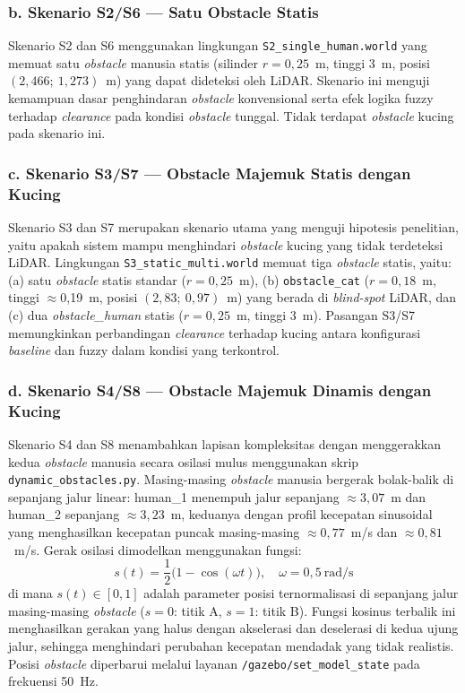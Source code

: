 \subsubsection*{b. Skenario S2/S6 --- Satu Obstacle Statis}

Skenario S2 dan S6 menggunakan lingkungan \texttt{S2\_single\_human.world} yang memuat satu \textit{obstacle} manusia statis (silinder $r = 0{,}25$~m, tinggi 3~m, posisi $(2{,}466;\ 1{,}273)$~m) yang dapat dideteksi oleh LiDAR. Skenario ini menguji kemampuan dasar penghindaran \textit{obstacle} konvensional serta efek logika fuzzy terhadap \textit{clearance} pada kondisi \textit{obstacle} tunggal. Tidak terdapat \textit{obstacle} kucing pada skenario ini.

\subsubsection*{c. Skenario S3/S7 --- Obstacle Majemuk Statis dengan Kucing}

Skenario S3 dan S7 merupakan skenario utama yang menguji hipotesis penelitian, yaitu apakah sistem mampu menghindari \textit{obstacle} kucing yang tidak terdeteksi LiDAR. Lingkungan \texttt{S3\_static\_multi.world} memuat tiga \textit{obstacle} statis, yaitu: (a) satu \textit{obstacle} statis standar ($r = 0{,}25$~m), (b) \texttt{obstacle\_cat} ($r = 0{,}18$~m, tinggi $\approx$0,19~m, posisi $(2{,}83;\ 0{,}97)$~m) yang berada di \textit{blind-spot} LiDAR, dan (c) dua \textit{obstacle\_human} statis ($r = 0{,}25$~m, tinggi 3~m). Pasangan S3/S7 memungkinkan perbandingan \textit{clearance} terhadap kucing antara konfigurasi \textit{baseline} dan fuzzy dalam kondisi yang terkontrol.

\subsubsection*{d. Skenario S4/S8 --- Obstacle Majemuk Dinamis dengan Kucing}

Skenario S4 dan S8 menambahkan lapisan kompleksitas dengan menggerakkan kedua \textit{obstacle} manusia secara osilasi mulus menggunakan skrip \texttt{dynamic\_obstacles.py}. Masing-masing \textit{obstacle} manusia bergerak bolak-balik di sepanjang jalur linear: human\_1 menempuh jalur sepanjang $\approx 3{,}07$~m dan human\_2 sepanjang $\approx 3{,}23$~m, keduanya dengan profil kecepatan sinusoidal yang menghasilkan kecepatan puncak masing-masing $\approx 0{,}77$~m/s dan $\approx 0{,}81$~m/s. Gerak osilasi dimodelkan menggunakan fungsi:
\begin{equation}
    s(t) = \frac{1}{2}\bigl(1 - \cos(\omega t)\bigr),
    \quad \omega = 0{,}5~\text{rad/s}
    \label{eq:osilasi_human}
\end{equation}
di mana $s(t) \in [0, 1]$ adalah parameter posisi ternormalisasi di sepanjang jalur masing-masing \textit{obstacle} ($s=0$: titik A, $s=1$: titik B). Fungsi kosinus terbalik ini menghasilkan gerakan yang halus dengan akselerasi dan deselerasi di kedua ujung jalur, sehingga menghindari perubahan kecepatan mendadak yang tidak realistis. Posisi \textit{obstacle} diperbarui melalui layanan \texttt{/gazebo/set\_model\_state} pada frekuensi 50~Hz.

